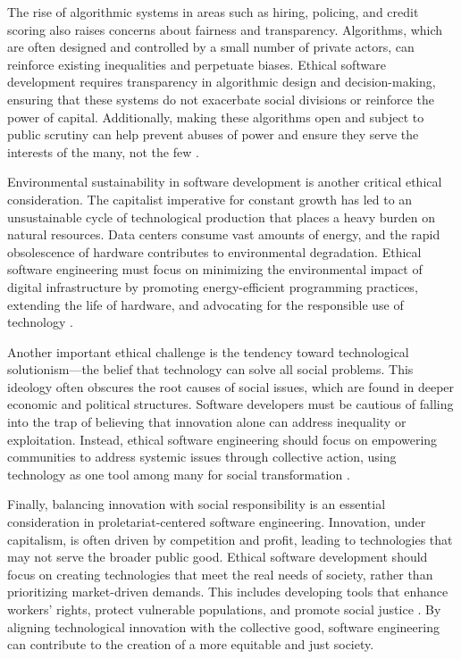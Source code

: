 \begin{refsection}
The rise of algorithmic systems in areas such as hiring, policing, and credit scoring also raises concerns about fairness and transparency. Algorithms, which are often designed and controlled by a small number of private actors, can reinforce existing inequalities and perpetuate biases. Ethical software development requires transparency in algorithmic design and decision-making, ensuring that these systems do not exacerbate social divisions or reinforce the power of capital. Additionally, making these algorithms open and subject to public scrutiny can help prevent abuses of power and ensure they serve the interests of the many, not the few \cite[pp.~48-50]{noble2018}.

Environmental sustainability in software development is another critical ethical consideration. The capitalist imperative for constant growth has led to an unsustainable cycle of technological production that places a heavy burden on natural resources. Data centers consume vast amounts of energy, and the rapid obsolescence of hardware contributes to environmental degradation. Ethical software engineering must focus on minimizing the environmental impact of digital infrastructure by promoting energy-efficient programming practices, extending the life of hardware, and advocating for the responsible use of technology \cite[pp.~160-162]{benkler2010}.

Another important ethical challenge is the tendency toward technological solutionism—the belief that technology can solve all social problems. This ideology often obscures the root causes of social issues, which are found in deeper economic and political structures. Software developers must be cautious of falling into the trap of believing that innovation alone can address inequality or exploitation. Instead, ethical software engineering should focus on empowering communities to address systemic issues through collective action, using technology as one tool among many for social transformation \cite[pp.~67-69]{morozov2015}.

Finally, balancing innovation with social responsibility is an essential consideration in proletariat-centered software engineering. Innovation, under capitalism, is often driven by competition and profit, leading to technologies that may not serve the broader public good. Ethical software development should focus on creating technologies that meet the real needs of society, rather than prioritizing market-driven demands. This includes developing tools that enhance workers' rights, protect vulnerable populations, and promote social justice \cite[pp.~102-104]{dean2018}. By aligning technological innovation with the collective good, software engineering can contribute to the creation of a more equitable and just society.


\end{refsection}
